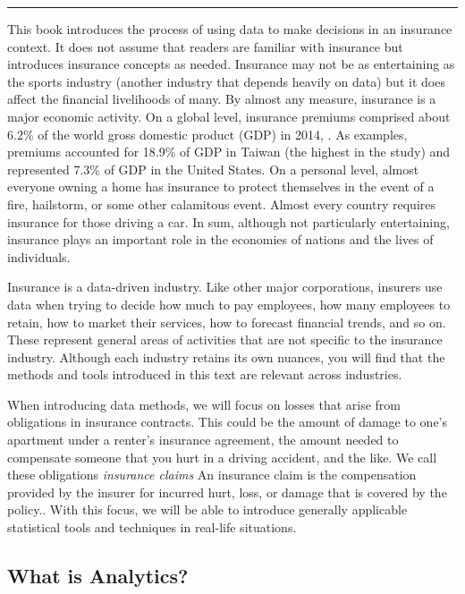 \documentclass[]{book}
\theoremstyle{definition}
\theoremstyle{definition}
\theoremstyle{definition}
\theoremstyle{remark}
\begin{document}
\begin{center}\rule{0.5\linewidth}{\linethickness}\end{center}

This book introduces the process of using data to make decisions in an
insurance context. It does not assume that readers are familiar with
insurance but introduces insurance concepts as needed. Insurance may not
be as entertaining as the sports industry (another industry that depends
heavily on data) but it does affect the financial livelihoods of many.
By almost any measure, insurance is a major economic activity. On a
global level, insurance premiums comprised about 6.2\% of the world
gross domestic product (GDP) in 2014, \citep{III2016}. As examples,
premiums accounted for 18.9\% of GDP in Taiwan (the highest in the
study) and represented 7.3\% of GDP in the United States. On a personal
level, almost everyone owning a home has insurance to protect themselves
in the event of a fire, hailstorm, or some other calamitous event.
Almost every country requires insurance for those driving a car. In sum,
although not particularly entertaining, insurance plays an important
role in the economies of nations and the lives of individuals.

Insurance is a data-driven industry. Like other major corporations,
insurers use data when trying to decide how much to pay employees, how
many employees to retain, how to market their services, how to forecast
financial trends, and so on. These represent general areas of activities
that are not specific to the insurance industry. Although each industry
retains its own nuances, you will find that the methods and tools
introduced in this text are relevant across industries.

When introducing data methods, we will focus on losses that arise from
obligations in insurance contracts. This could be the amount of damage
to one's apartment under a renter's insurance agreement, the amount
needed to compensate someone that you hurt in a driving accident, and
the like. We call these obligations \emph{insurance claims}{ An
insurance claim is the compensation provided by the insurer for incurred
hurt, loss, or damage that is covered by the policy.}. With this focus,
we will be able to introduce generally applicable statistical tools and
techniques in real-life situations.

\subsection{What is Analytics?}\label{what-is-analytics}
\end{document}
